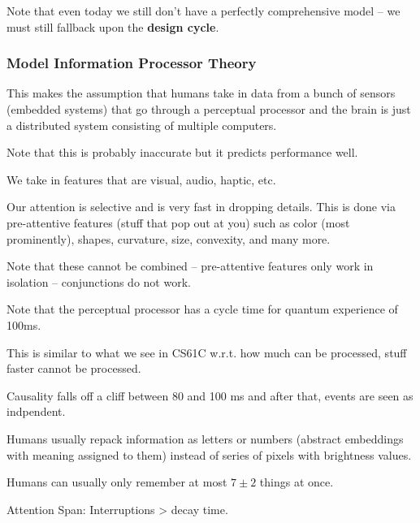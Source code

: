 \begin{important}
Note that even today we still don't have a perfectly comprehensive model -- we must still fallback upon the \textbf{design cycle}.
\end{important}

\subsubsection{Model Information Processor Theory}
This makes the assumption that humans take in data from a bunch of sensors (embedded systems) that go through a perceptual processor and the brain is just a distributed system consisting of multiple computers.
\begin{shaded}
Note that this is probably inaccurate but it predicts performance well.
\end{shaded}

We take in features that are visual, audio, haptic, etc.

Our attention is selective and is very fast in dropping details. This is done via pre-attentive features (stuff that pop out at you) such as color (most prominently), shapes, curvature, size, convexity, and many more.
\begin{important}
Note that these cannot be combined -- pre-attentive features only work in isolation -- conjunctions do not work.
\end{important}

\begin{shaded}
Note that the perceptual processor has a cycle time for quantum experience of 100ms.

This is similar to what we see in CS61C w.r.t. how much can be processed, stuff faster cannot be processed.
\end{shaded}

Causality falls off a cliff between 80 and 100 ms and after that, events are seen as indpendent.

Humans usually repack information as letters or numbers (abstract embeddings with meaning assigned to them) instead of series of pixels with brightness values.

Humans can usually only remember at most $7\pm2$ things at once.

\begin{shaded}
    Attention Span: Interruptions > decay time.
\end{shaded}

